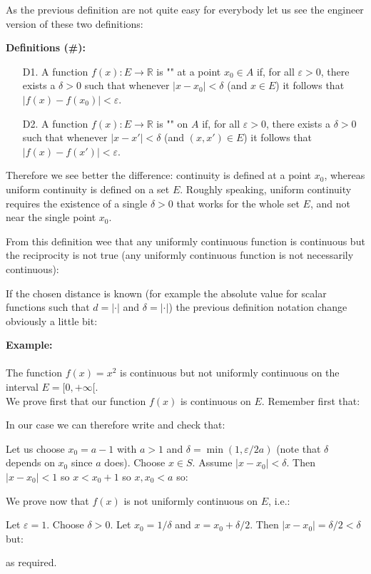	As the previous definition are not quite easy for everybody let us see the engineer version of these two definitions:
	
	\pagebreak
	\textbf{Definitions (\#\mydef):}
	\begin{enumerate}
		\item[D1.] A function $f(x):E \rightarrow \mathbb{R}$ is "" at a point $x_0\in A$ if, for all $\varepsilon>0$, there exists a $\delta>0$ such that whenever $|x-x_0|<\delta$ (and $x\in E$) it follows that $|f(x)-f(x_0)|<\varepsilon$.
		
		\item[D2.] A function $f(x):E \rightarrow \mathbb{R}$ is "" on $A$ if, for all $\varepsilon>0$, there exists a $\delta>0$ such that whenever $|x-x'|<\delta$ (and $(x,x')\in E$) it follows that $|f(x)-f(x')|<\varepsilon$.
	\end{enumerate}
	Therefore we see better the difference: continuity is defined at a point $x_0$, whereas uniform continuity is defined on a set $E$. Roughly speaking, uniform continuity requires the existence of a single $\delta>0$ that works for the whole set $E$, and not near the single point $x_0$.
	
	From this definition wee that any uniformly continuous function is continuous but the reciprocity is not true (any uniformly continuous function is not necessarily continuous):
	
	If the chosen distance is known (for example the absolute value for scalar functions such that $d=|\cdot|$ and $\delta=|\cdot|$) the previous definition notation change obviously a little bit:
	
	
	\begin{tcolorbox}[colframe=black,colback=white,sharp corners]
	\textbf{{\Large {}}Example:}\\\\
	The function $f(x) = x^2$ is continuous but not uniformly continuous
on the interval $E = [0,+\infty[$.\\

	We prove first that our function $f(x)$ is continuous on $E$. Remember first that:
	
	In our case we can therefore write and check that:
	
	
	Let us choose $x_0=a-1$ with $a>1$ and $\delta=\min(1,\varepsilon/2a)$ (note that $\delta$ depends on $x_0$ since $a$ does). Choose $x \in S$. Assume $|x-x_0|<\delta$. Then $|x-x_0|<1$ so $x<x_0+1$ so $x,x_0<a$ so:
	
	We prove now that $f(x)$ is not uniformly continuous on $E$, i.e.:
	
	Let $\varepsilon=1$. Choose $\delta>0$. Let $x_0=1/\delta$ and $x=x_0+\delta/2$. Then $|x-x_0|=\delta/2<\delta$ but:
	
	as required.
	\end{tcolorbox}
	
